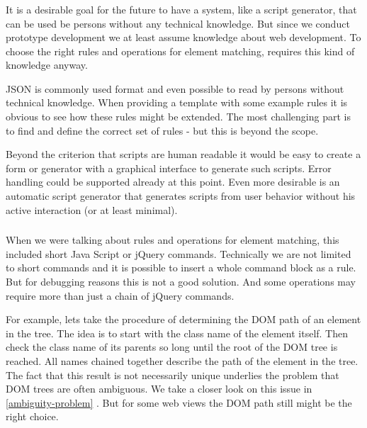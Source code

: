 \subsubsection[Syntax]{\reqSiii}

It is a desirable goal for the future to have a system, like a script generator, that can be used be persons without any technical knowledge. But since we conduct prototype development we at least assume knowledge about web development. To choose the right rules and operations for element matching, requires this kind of knowledge anyway. 

JSON is commonly used format and even possible to read by persons without technical knowledge. When providing a template with some example rules it is obvious to see how these rules might be extended. 
The most challenging part is to find and define the correct set of rules - but this is beyond the scope. 

Beyond the criterion that scripts are human readable it would be easy to create a form or generator with a graphical interface to generate such scripts. Error handling could be supported already at this point. Even more desirable is an automatic script generator that generates scripts from user behavior without his active interaction (or at least minimal). 

\subsubsection[Plugin Extension]{\reqSiv}

When we were talking about rules and operations for element matching, this included short Java Script or jQuery commands. Technically we are not limited to short commands and it is possible to insert a whole command block as a rule. But for debugging reasons this is not a good solution. And some operations may require more than just a chain of jQuery commands. 

For example, lets take the procedure of determining the DOM path of an element in the tree. The idea is to start with the class name of the element itself. Then check the class name of its parents so long until the root of the DOM tree is reached. All names chained together describe the path of the element in the tree. The fact that this result is not necessarily unique underlies the problem that DOM trees are often ambiguous. We take a closer look on this issue in \ref{ambiguity-problem} . But for some web views the DOM path still might be the right choice. 

